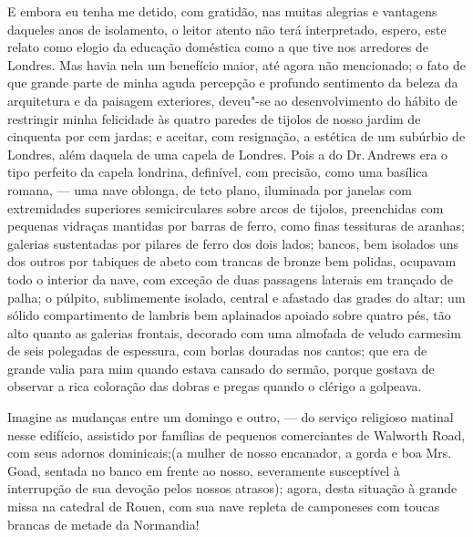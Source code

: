 E embora eu tenha me detido, com gratidão, nas muitas alegrias e
vantagens daqueles anos de isolamento, o leitor atento não terá
interpretado, espero, este relato como elogio da educação doméstica como
a que tive nos arredores de Londres. Mas havia nela um benefício maior,
até agora não mencionado; o fato de que grande parte de minha aguda
percepção e profundo sentimento da beleza da arquitetura e da paisagem
exteriores, deveu"-se ao desenvolvimento do hábito de restringir minha
felicidade às quatro paredes de tijolos de nosso jardim de cinquenta por
cem jardas; e aceitar, com resignação, a estética de um subúrbio de
Londres, além daquela de uma capela de Londres. Pois a do Dr.\,Andrews
era o tipo perfeito da capela londrina, definível, com precisão, como
uma basílica romana, --- uma nave oblonga, de teto plano, iluminada por
janelas com extremidades superiores semicirculares sobre arcos de
tijolos, preenchidas com pequenas vidraças mantidas por barras de ferro,
como finas tessituras de aranhas; galerias sustentadas por pilares de
ferro dos dois lados; bancos, bem isolados uns dos outros por tabiques
de abeto com trancas de bronze bem polidas, ocupavam todo o interior da
nave, com exceção de duas passagens laterais em trançado de palha; o
púlpito, sublimemente isolado, central e afastado das grades do altar;
um sólido compartimento de lambris bem aplainados apoiado sobre quatro
pés, tão alto quanto as galerias frontais, decorado com uma almofada de
veludo carmesim de seis polegadas de espessura, com borlas douradas nos
cantos; que era de grande valia para mim quando estava cansado do
sermão, porque gostava de observar a rica coloração das dobras e pregas
quando o clérigo a golpeava.

Imagine as mudanças entre um domingo e outro, --- do serviço
religioso matinal nesse edifício, assistido por famílias de pequenos
comerciantes de Walworth Road, com seus adornos dominicais;(a mulher de
nosso encanador, a gorda e boa Mrs.\,Goad, sentada no banco em frente ao
nosso, severamente susceptível à interrupção de sua devoção pelos nossos
atrasos); agora, desta situação à grande missa na catedral de Rouen, com
sua nave repleta de camponeses com toucas brancas de metade da
Normandia!

